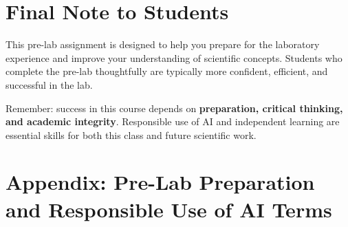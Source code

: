 \documentclass[
  letterpaper,
  DIV=11,
  numbers=noendperiod]{scrreprt}
\begin{document}
\section*{\texorpdfstring{\textbf{Final Note to
Students}}{Final Note to Students}}\label{final-note-to-students}


This pre-lab assignment is designed to help you prepare for the
laboratory experience and improve your understanding of scientific
concepts. Students who complete the pre-lab thoughtfully are typically
more confident, efficient, and successful in the lab.

Remember: success in this course depends on \textbf{preparation,
critical thinking, and academic integrity}. Responsible use of AI and
independent learning are essential skills for both this class and future
scientific work.

\section*{\texorpdfstring{\textbf{Appendix: Pre-Lab Preparation and
Responsible Use of AI
Terms}}{Appendix: Pre-Lab Preparation and Responsible Use of AI Terms}}\label{appendix-pre-lab-preparation-and-responsible-use-of-ai-terms}

\end{document}

